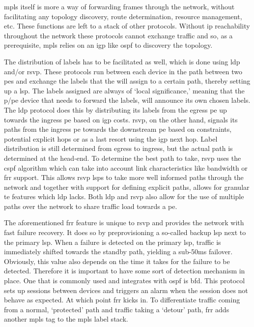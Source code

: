 \ac{mpls} itself is more a way of forwarding frames through the network, without facilitating any topology discovery, route determination, resource management, etc. These functions are left to a stack of other protocols. Without \ac{ip} reachability throughout the network these protocols cannot exchange traffic and so, as a prerequisite, \ac{mpls} relies on an \ac{igp} like \ac{ospf} to discovery the topology.

The distribution of labels has to be facilitated as well, which is done using \ac{ldp} and/or \ac{rsvp}. These protocols run between each device in the path between two \acp{pe} and exchange the labels that the will assign to a certain path, thereby setting up a \ac{lsp}. The labels assigned are always of `local significance,' meaning that the \ac{p}/\ac{pe} device that needs to forward the labels, will announce its own chosen labels. The \ac{ldp} protocol does this by distributing its labels from the egress \ac{pe} up towards the ingress \ac{pe} based on \ac{igp} costs. \ac{rsvp}, on the other hand, signals its paths from the ingress \ac{pe} towards the downstream \ac{pe} based on constraints, potential explicit hops or as a last resort using the \ac{igp} next hop. Label distribution is still determined from egress to ingress, but the actual path is determined at the head-end. To determine the best path to take, \ac{rsvp} uses the \ac{cspf} algorithm which can take into account link characteristics like bandwidth or \ac{frr} support. This allows \ac{rsvp} \acp{lsp} to take more well informed paths through the network and together with support for defining explicit paths, allows for granular \ac{te} features which \ac{ldp} lacks. Both \ac{ldp} and \ac{rsvp} also allow for the use of multiple paths over the network to share traffic load towards a \ac{pe}.

The aforementioned \ac{frr} feature is unique to \ac{rsvp} and provides the network with fast failure recovery. It does so by preprovisioning a so-called backup \ac{lsp} next to the primary \ac{lsp}. When a failure is detected on the primary \ac{lsp}, traffic is immediately shifted towards the standby path, yielding a sub-50ms failover. Obviously, this value also depends on the time it takes for the failure to be detected. Therefore it is important to have some sort of detection mechanism in place. One that is commonly used and integrates with \ac{ospf} is \ac{bfd}. This protocol sets up sessions between devices and triggers an alarm when the session does not behave as expected. At which point \ac{frr} kicks in. To differentiate traffic coming from a normal, `protected' path and traffic taking a `detour' path, \ac{frr} adds another \ac{mpls} tag to the \ac{mpls} label stack.

